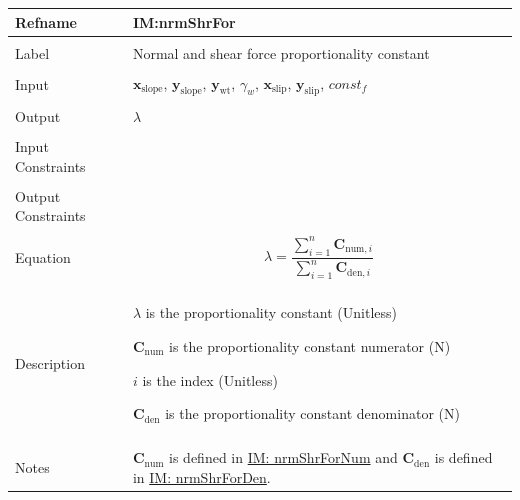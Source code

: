 \documentclass[12pt]{article}
\begin{document}
\vspace{\baselineskip}
\noindent
\begin{minipage}{\textwidth}
\begin{tabular}{>{\raggedright}p{}>{\raggedright\arraybackslash}p{}}
\toprule \textbf{Refname} & \textbf{IM:nrmShrFor}
\label{IM:nrmShrFor}
\\ \midrule \\
Label & Normal and shear force proportionality constant
        
\\ \midrule \\
Input & ${\mathbf{x}_{\text{slope}}}$, ${\mathbf{y}_{\text{slope}}}$, ${\mathbf{y}_{\text{wt}}}$, ${γ_{w}}$, ${\mathbf{x}_{\text{slip}}}$, ${\mathbf{y}_{\text{slip}}}$, $const_f$
        
\\ \midrule \\
Output & $λ$
         
\\ \midrule \\
Input Constraints & 
\\ \midrule \\
Output Constraints & 
\\ \midrule \\
Equation & \begin{displaymath}
           λ=\frac{\displaystyle\sum_{i=1}^{n}{{\mathbf{C}_{\text{num},i}}}}{\displaystyle\sum_{i=1}^{n}{{\mathbf{C}_{\text{den},i}}}}
           \end{displaymath}
\\ \midrule \\
Description & \begin{symbDescription}
              \item{$λ$ is the proportionality constant (Unitless)}
              \item{${\mathbf{C}_{\text{num}}}$ is the proportionality constant numerator (N)}
              \item{$i$ is the index (Unitless)}
              \item{${\mathbf{C}_{\text{den}}}$ is the proportionality constant denominator (N)}
              \end{symbDescription}
\\ \midrule \\
Notes & ${\mathbf{C}_{\text{num}}}$ is defined in \hyperref[IM:nrmShrForNum]{IM: nrmShrForNum} and ${\mathbf{C}_{\text{den}}}$ is defined in \hyperref[IM:nrmShrForDen]{IM: nrmShrForDen}.
        

\end{tabular}
\end{minipage}
\end{document}

